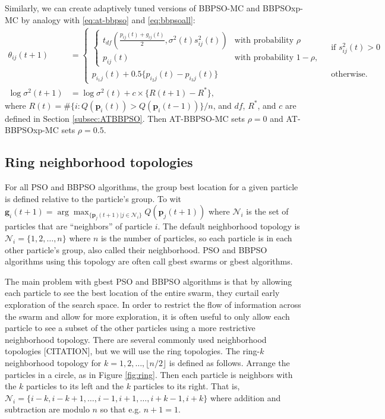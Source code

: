 \documentclass[12pt]{article}
\begin{document}
Similarly, we can create adaptively tuned versions of BBPSO-MC and BBPSOxp-MC by analogy with \eqref{eq:at-bbpso} and \eqref{eq:bbpsoall}:
\begin{align*}%
\theta_{ij}(t+1) &= 
  \begin{cases} 
    \begin{cases} t_{df}\left(\frac{p_{ij}(t) + g_{ij}(t)}{2}, \sigma^2(t)s^2_{ij}(t)\right) & \mbox{with probability } \rho\\
      p_{ij}(t) & \mbox{with probability } 1 - \rho,
    \end{cases}
    & \mbox{ if } s^2_{ij}(t) > 0\\
    p_{i_1j}(t) + 0.5\{p_{i_2j}(t) - p_{i_3j}(t)\} & \mbox{ otherwise.}
  \end{cases}\\
\log\sigma^2(t+1) &= \log\sigma^2(t) + c\times\{R(t+1) - R^*\},
\end{align*}
where $R(t)=\#\{i:Q(\bm{p}_i(t))> Q(\bm{p}_i(t-1))\}/n$, and $df$, $R^*$, and $c$ are defined in Section \ref{subsec:ATBBPSO}. Then AT-BBPSO-MC sets $\rho=0$ and AT-BBPSOxp-MC sets $\rho=0.5$.

\subsection{Ring neighborhood topologies}\label{subapp:ring}
For all PSO and BBPSO algorithms, the group best location for a given particle is defined relative to the particle's group. To wit $\bm{g}_i(t+1) = \arg\max_{\{\bm{p}_j(t+1)|j\in\mathcal{N}_i\}}Q(\bm{p}_j(t+1))$ where $\mathcal{N}_i$ is the set of particles that are ``neighbors'' of particle $i$. The default neighborhood topology is $\mathcal{N}_i = \{1, 2, \dots, n\}$ where $n$ is the number of particles, so each particle is in each other particle's group, also called their neighborhood. PSO and BBPSO algorithms using this topology are often call gbest swarms or gbest algorithms. 

The main problem with gbest PSO and BBPSO algorithms is that by allowing each particle to see the best location of the entire swarm, they curtail early exploration of the search space. In order to restrict the flow of information across the swarm and allow for more exploration, it is often useful to only allow each particle to see a subset of the other particles using a more restrictive neighborhood topology. There are several commonly used neighborhood topologies [CITATION], but we will use the ring topologies. The ring-$k$ neighborhood topology for $k=1,2,\dots,\lfloor n/2\rfloor$ is defined as follows. Arrange the particles in a circle, as in Figure \ref{fig:ring}. Then each particle is neighbors with the $k$ particles to its left and the $k$ particles to its right. That is, $\mathcal{N}_i = \{i-k, i-k+1, \dots, i-1, i+1, \dots, i+k-1, i+k\}$ where addition and subtraction are modulo $n$ so that e.g. $n + 1 = 1$.
\end{document}
